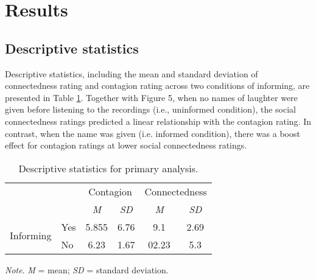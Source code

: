 \section{Results}
\subsection{Descriptive statistics}
Descriptive statistics, including the mean and standard deviation of connectedness rating and contagion rating across two conditions of informing, are presented in Table \ref{tab:table1}. Together with Figure 5, when no names of laughter were given before listening to the recordings (i.e., uninformed condition), the social connectedness ratings predicted a linear relationship with the contagion rating. In contrast, when the name was given (i.e. informed condition), there was a boost effect for contagion ratings at lower social connectedness ratings.



\begin{table}[h!]
\centering
\begin{threeparttable}
\caption{Descriptive statistics for primary analysis.}
\label{tab:table1}
\begin{tabular}{l l c c c c} 
    \toprule
    & & \multicolumn{2}{c}{Contagion} & \multicolumn{2}{c}{Connectedness}  \\ \cmidrule{3-6}
    & & \textit{M} & \textit{SD} & \textit{M} & \textit{SD}   \\ \cmidrule{3-6}
    \multirow{ 2}{*}{Informing} & Yes & 5.855 & 6.76 & 9.1 & 2.69 \\ & No & 6.23 & 1.67 & 02.23 &5.3 \\
      \bottomrule
\end{tabular}
\begin{tablenotes}
\small
\textit{Note}. \textit{M} = mean; \textit{SD} = standard deviation.
\end{tablenotes}
\end{threeparttable}
\end{table}


